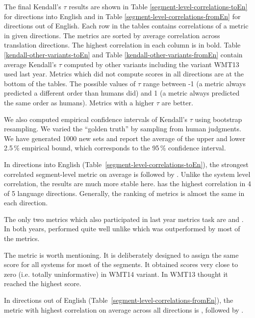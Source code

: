 \afterpage{\clearpage}




The final Kendall's $\tau$ results are shown in Table
\ref{segment-level-correlations-toEn} for directions into English and in Table
\ref{segment-level-correlations-fromEn} for directions out of English.  Each
row in the tables contains correlations of a metric in given directions. The
metrics are sorted by average correlation across translation directions.  The
highest correlation in each column is in bold. Table
\ref{kendall-other-variants-toEn} and Table \ref{kendall-other-variants-fromEn}
contain average Kendall's $\tau$ computed by other variants including the
variant WMT13 used last year.  Metrics which did not compute scores in all
directions are at the bottom of the tables. The possible values of $\tau$ range
between -1 (a metric always predicted a different order than humans did) and 1
(a metric always predicted the same order as humans). Metrics with a higher
$\tau$ are better.

We also computed empirical confidence intervals of Kendall's $\tau$ using bootstrap
resampling. We varied the ``golden truth'' by sampling from human judgments. We
have generated 1000 new sets and report the average of the upper and lower
2.5\,\% empirical bound, which corresponds to the 95\,\% confidence interval.




In directions into English (Table~\ref{segment-level-correlations-toEn}), the
strongest correlated segment-level metric on average is
 followed by . Unlike the system level
correlation, the results are much more stable here.
 has the highest correlation in 4 of 5 language
directions. Generally, the ranking of metrics is almost the same in each
direction. 

The only two metrics which also participated in last year metrics task are
 and . In both years,  performed
quite well unlike  which was outperformed by most of the
metrics. 

The metric  is worth mentioning.  It is deliberately
designed to assign the same score for all systems for most of the segments.  It
obtained scores very close to zero (i.e. totally uninformative) in WMT14
variant.  In WMT13 thought it reached the highest score.

In directions out of English (Table~\ref{segment-level-correlations-fromEn}),
the metric with highest correlation on average across all directions is
, followed by .

